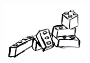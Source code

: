    \begin{figure}[b]
        \vspace{1cm}
        \centering\includegraphics[width=0.4\textwidth]{lego2.jpg}
        \vspace{1cm}
    \end{figure}








